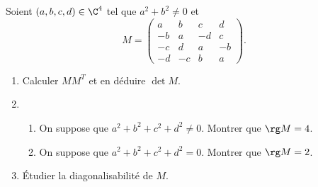 \begin{enonce}
\begin{exercise}[ID={RMS135 E1418},subtitle={CCINP MP 2024},tags={},difficulty={}]
Soient $(a, b, c, d) \in \C^4$ tel que $a^2 + b^2 \neq 0$ et
\begin{equation*}
  M = \begin{pmatrix} a & b & c & d \\ -b & a & -d & c \\ -c & d & a & -b \\ -d & -c & b & a \end{pmatrix}. 
\end{equation*}
\begin{enumerate}
  \item Calculer $M M^T$ et en déduire $\det M$.
  \item
    \begin{enumerate}
      \item On suppose que $a^2 + b^2 + c^2 + d^2 \neq 0$. Montrer que $\rg M = 4$.
      \item On suppose que $a^2 + b^2 + c^2 + d^2 = 0$. Montrer que $\rg M = 2$.
    \end{enumerate}
  \item Étudier la diagonalisabilité de $M$.
\end{enumerate}
\end{exercise}
\begin{solution}
\end{solution}
\end{enonce}
